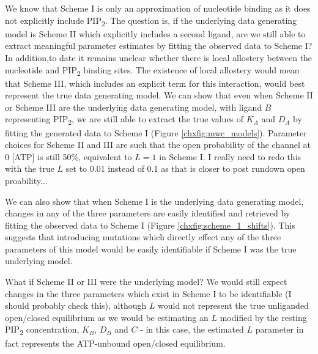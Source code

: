 We know that Scheme I is only an approximation of nucleotide binding as it does not explicitly include PIP\textsubscript{2}.
The question is, if the underlying data generating model is Scheme II which explicitly includes a second ligand, are we still able to extract meaningful parameter estimates by fitting the observed data to Scheme I?
In addition,to date it remains unclear whether there is local allostery between the nucleotide and PIP\textsubscript{2} binding sites.
The existence of local allostery would mean that Scheme III, which includes an explicit term for this interaction, would best represent the true data generating model.
We can show that even when Scheme II or Scheme III are the underlying data generating model, with ligand $B$ representing PIP\textsubscript{2}, we are still able to extract the true values of $K_A$ and $D_A$ by fitting the generated data to Scheme I (Figure \ref{chxfig:mwc_models}).
Parameter choices for Scheme II and III are such that the open probability of the channel at 0 [ATP] is still 50\%, equivalent to $L=1$ in Scheme I.
I really need to redo this with the true $L$ set to $0.01$ instead of $0.1$ as that is closer to post rundown open proability...

We can also show that when Scheme I is the underlying data generating model, changes in any of the three parameters are easily identified and retrieved by fitting the observed data to Scheme I (Figure \ref{chxfig:scheme_1_shifts}).
This suggests that introducing mutations which directly effect any of the three parameters of this model would be easily identifiable if Scheme I was the true underlying model.

What if Scheme II or III were the underlying model?
We would still expect changes in the three parameters which exist in Scheme I to be identifiable (I should probably check this), although $L$ would not represent the true unliganded open/closed equilibrium as we would be estimating an $L$ modified by the resting PIP\textsubscript{2} concentration, $K_B$, $D_B$ and $C$ - in this case, the estimated $L$ parameter in fact represents the ATP-unbound open/closed equilibrium.

